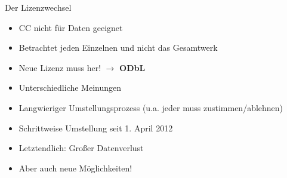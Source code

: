 \documentclass{beamer}
\begin{document}
\begin{frame}{Der Lizenzwechsel}
    \pause
    \begin{itemize}
        \item CC nicht für Daten geeignet
        \item Betrachtet jeden Einzelnen und nicht das Gesamtwerk
    \end{itemize}

    \pause

    \begin{itemize}
        \item Neue Lizenz muss her! $\rightarrow$ \textbf{ODbL}
    \end{itemize}

    \pause

    \begin{itemize}
        \item Unterschiedliche Meinungen
        \item Langwieriger Umstellungsprozess (u.a. jeder muss zustimmen/ablehnen)
        \item Schrittweise Umstellung seit 1. April 2012
    \end{itemize}

    \pause

    \begin{itemize}
        \item Letztendlich: Großer Datenverlust
        \item Aber auch neue Möglichkeiten!
    \end{itemize}
\end{frame}
\end{document}
